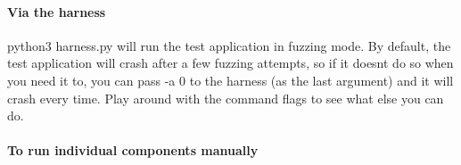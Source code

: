 \paragraph*{Via the harness}

{\ttfamily python3 harness.\+py} will run the test application in fuzzing mode. By default, the test application will crash after a few fuzzing attempts, so if it doesn\textquotesingle{}t do so when you need it to, you can pass {\ttfamily -\/a 0} to the harness (as the last argument) and it will crash every time. Play around with the command flags to see what else you can do.

\paragraph*{To run individual components manually}

